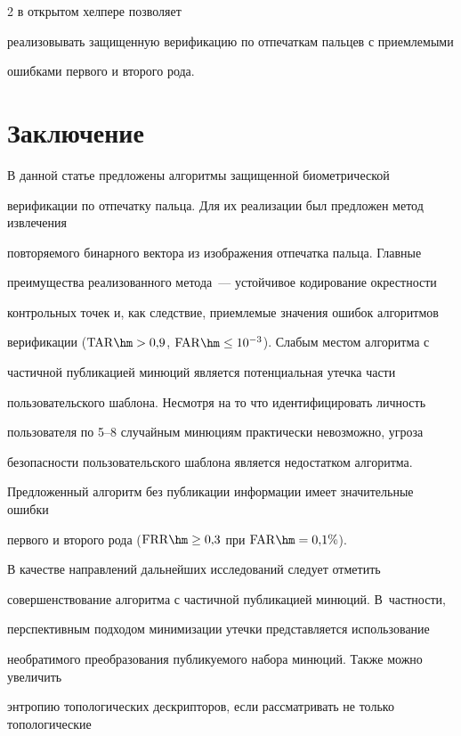 \begin{multicols}{2}
 в открытом хелпере позволяет 

реализовывать защищенную верификацию по отпечаткам пальцев с приемлемыми 

ошибками первого и второго рода. 





\section{Заключение}

      В данной статье предложены алгоритмы защищенной биометрической 

верификации по отпечатку пальца. Для их реализации был предложен метод извлечения 

повторяемого бинарного вектора из изображения отпечатка пальца. Главные 

преимущества реализованного метода~--- устойчивое кодирование окрестности 

контрольных точек и, как следствие, приемлемые значения ошибок алгоритмов 

верификации ($\mathrm{TAR}\hm > 0{,}9$, $\mathrm{FAR}\hm\leq 10^{-3}$). Слабым местом алгоритма с 

частичной публикацией минюций является потенциальная утечка час\-ти 

пользовательского шаблона. Несмотря на то что идентифицировать личность 

пользователя по 5--8 случайным минюциям практически не\-воз\-можно, угроза 

безопасности пользовательского шаблона является недостатком алгоритма. 

Предложенный алгоритм без публикации информации \mbox{имеет} значительные ошибки 

первого и второго рода ($\mathrm{FRR}\hm\geq 0{,}3$ при $\mathrm{FAR}\hm =0{,}1\%$).

      

      В качестве направлений дальнейших исследований следует отметить 

совершенствование алгоритма с частичной публикацией минюций. В~част\-ности, 

перспективным подходом минимизации утечки представляется использование 

необратимого преобразования публикуемого набора минюций. Также можно увеличить 

энтропию топологических дескрипторов, если рассматривать не только топологические 


\end{multicols}
